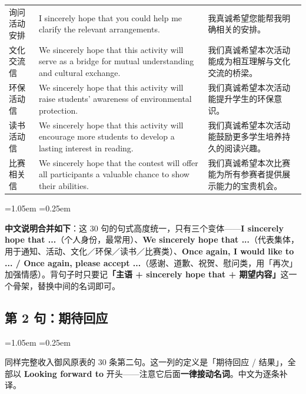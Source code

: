\documentclass[11pt,a4paper]{ctexart}
\newcommand{\kw}[1]{{\bfseries\color{accent}#1}}
\newenvironment{note}{%
  \par\addvspace{5pt}%
  \begin{list}{}{\leftmargin=1.05em \rightmargin=0.25em \listparindent=0pt
    \itemindent=0pt \topsep=0pt \parsep=2pt \itemsep=2pt \partopsep=0pt}%
  \item\relax\small\color{ink}%
}{%
  \end{list}\addvspace{5pt}%
}
\begin{document}
\begin{longtable}{L{2.2cm}L{9.0cm}L{4.7cm}}
询问活动安排 & I sincerely hope that you could help me clarify the relevant arrangements. & 我真诚希望您能帮我明确相关的安排。 \\
文化交流信 & We sincerely hope that this activity will serve as a bridge for mutual understanding and cultural exchange. & 我们真诚希望本次活动能成为相互理解与文化交流的桥梁。 \\
环保活动信 & We sincerely hope that this activity will raise students' awareness of environmental protection. & 我们真诚希望本次活动能提升学生的环保意识。 \\
读书活动信 & We sincerely hope that this activity will encourage more students to develop a lasting interest in reading. & 我们真诚希望本次活动能鼓励更多学生培养持久的阅读兴趣。 \\
比赛相关信 & We sincerely hope that the contest will offer all participants a valuable chance to show their abilities. & 我们真诚希望本次比赛能为所有参赛者提供展示能力的宝贵机会。 \\

\end{longtable}

\begin{note}
\textbf{中文说明合并如下}：这 30 句的句式高度统一，只有三个变体——\kw{I sincerely hope that ...}（个人身份，最常用）、\kw{We sincerely hope that ...}（代表集体，用于通知、活动、文化／环保／读书／比赛类）、\kw{Once again, I would like to ... / Once again, please accept ...}（感谢、道歉、祝贺、慰问类，用「再次」加强情感）。背句子时只要记\textbf{「主语 + sincerely hope that + 期望内容」}这一个骨架，替换中间的名词即可。
\end{note}


\subsection{第 2 句：期待回应}

\begin{note}
同样完整收入御风原表的 30 条第二句。这一列的定义是「期待回应 / 结果」，全部以 \kw{Looking forward to} 开头——注意它后面\textbf{一律接动名词}。中文为逐条补译。
\end{note}
\end{document}
